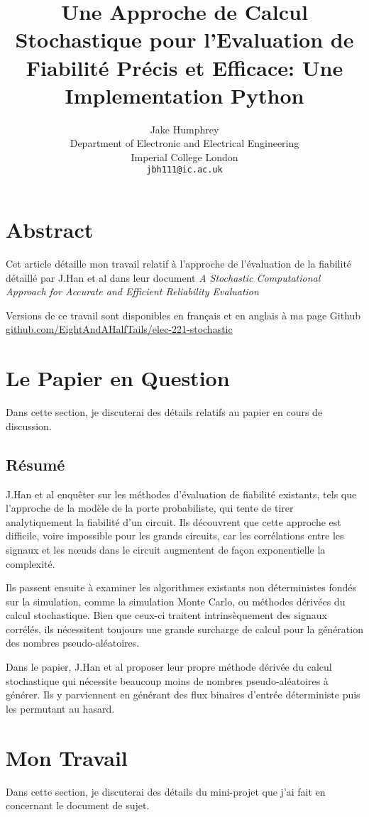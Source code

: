 \documentclass{article}
\title{Une Approche de Calcul Stochastique pour l'Evaluation de Fiabilité Précis et Efficace: Une Implementation Python}
\author{Jake Humphrey\\
	Department of Electronic and Electrical Engineering\\
  Imperial College London\\
  \texttt{jbh111@ic.ac.uk} }
\begin{document}
\maketitle

\section{Abstract}\label{sec:abstract}

Cet article détaille mon travail relatif à l'approche de l'évaluation de la fiabilité détaillé par J.Han et al dans leur document \emph{A Stochastic Computational Approach for Accurate and Efficient Reliability Evaluation}\cite{han12}

Versions de ce travail sont disponibles en français et en anglais à ma page Github \url{github.com/EightAndAHalfTails/elec-221-stochastic}

\section{Le Papier en Question}
Dans cette section, je discuterai des détails relatifs au papier en cours de discussion.

\subsection{Résumé}
J.Han et al enquêter sur les méthodes d'évaluation de fiabilité existants, tels que l'approche de la modèle de la porte probabiliste, qui tente de tirer analytiquement la fiabilité d'un circuit. Ils découvrent que cette approche est difficile, voire impossible pour les grands circuits, car les corrélations entre les signaux et les nœuds dans le circuit augmentent de façon exponentielle la complexité.

Ils passent ensuite à examiner les algorithmes existants non déterministes fondés sur la simulation, comme la simulation Monte Carlo, ou méthodes dérivées du calcul stochastique. Bien que ceux-ci traitent intrinsèquement des signaux corrélés, ils nécessitent toujours une grande surcharge de calcul pour la génération des nombres pseudo-aléatoires.

Dans le papier, J.Han et al proposer leur propre méthode dérivée du calcul stochastique qui nécessite beaucoup moins de nombres pseudo-aléatoires à générer. Ils y parviennent en générant des flux binaires d'entrée déterministe puis les permutant au hasard.

\section{Mon Travail}
Dans cette section, je discuterai des détails du mini-projet que j'ai fait en concernant le document de sujet.
\end{document}
